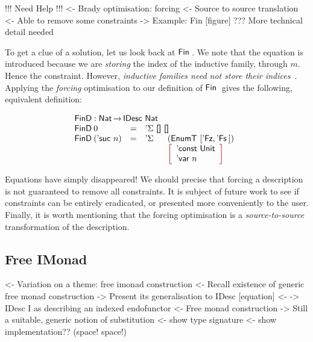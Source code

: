 
\begin{wstructure}
!!! Need Help !!!
<- Brady optimisation: forcing
    <- Source to source translation
    <- Able to remove some constraints
    -> Example: Fin [figure]
    ??? More technical detail needed
\end{wstructure}

To get a clue of a solution, let us look back at $\Fin$. We note that
the equation is introduced because we are \emph{storing} the index of
the inductive family, through $m$. Hence the constraint. However,
\emph{inductive families need not store their
  indices}~\cite{brady:index-inductive-families}. Applying the
\emph{forcing} optimisation to our definition of $\Fin$ gives the
following, equivalent definition:

\[\stk{
\FinD : \Nat \To \IDesc{\Nat} \\
\begin{array}{@{}llll}
\FinD\: 0            & = & \multicolumn{2}{l}{\DSigma{\Void}{\Void} } \\
\FinD\: (\NatSuc{n}) & = & \DSigma{}{} & (\EnumT{[ \FinZero , \FinSuc{} ]}) \\
                     &   &             & \bigRedBracket{
                                         \begin{array}{l}
                                         \DConst{\Unit} \\
                                         \DVar{n}
                                         \end{array}
                                         }
\end{array}
}\]

Equations have simply disappeared! We should precise that forcing a
description is not guaranteed to remove all constraints. It is subject
of future work to see if constraints can be entirely eradicated, or
presented more conveniently to the user. Finally, it is worth
mentioning that the forcing optimisation is a \emph{source-to-source}
transformation of the description.

\subsection{Free IMonad}

\begin{wstructure}
<- Variation on a theme: free imonad construction
    <- Recall existence of generic free monad construction
    -> Present its generalisation to IDesc [equation]
        <- \I -> IDesc I as describing an indexed endofunctor
        <- Free monad construction
    -> Still a suitable, generic notion of substitution
        <- show type signature
        <- show implementation?? (space! space!)
\end{wstructure}

